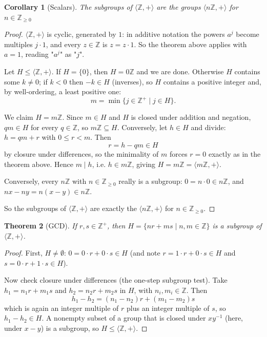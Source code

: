 \documentclass[11pt]{article}
\newcommand{\1}{\mathbf{1}}
\theoremstyle{notestyle}
\newtheorem{theorem}{Theorem}[section]
\newtheorem{corollary}[theorem]{Corollary}
\theoremstyle{definition}
\begin{document}
\begin{corollary}[Scalars]
\label{cor:label}
The subgroups of $\langle \mathbb{Z}, + \rangle$ are the groups $\langle n\mathbb{Z}, +\rangle$
for $n \in \mathbb{Z}_{\ge 0}$
\end{corollary}
\begin{proof}
$\langle \mathbb{Z}, + \rangle$ is cyclic, generated by $1$: in additive notation the
powers $a^{j}$ become multiples $j \cdot 1$, and every $z \in \mathbb{Z}$ is
$z = z \cdot 1$. So the theorem above applies with $a = 1$, reading "$a^{j}$" as
"$j$".
\par Let $H \le \langle \mathbb{Z}, + \rangle$. If $H = \{0\}$, then $H = 0\mathbb{Z}$
and we are done. Otherwise $H$ contains some $k \ne 0$; if $k < 0$ then $-k \in H$
(inverses), so $H$ contains a positive integer and, by well-ordering, a least
positive one:
$$m = \min\{j \in \mathbb{Z}^{+} \mid j \in H\}.$$
\par We claim $H = m\mathbb{Z}$. Since $m \in H$ and $H$ is closed under addition and
negation, $qm \in H$ for every $q \in \mathbb{Z}$, so $m\mathbb{Z} \subseteq H$.
Conversely, let $h \in H$ and divide: $h = qm + r$ with $0 \le r < m$. Then
$$r = h - qm \in H$$
by closure under differences, so the minimality of $m$ forces $r = 0$ exactly as in
the theorem above. Hence $m \mid h$, i.e. $h \in m\mathbb{Z}$, giving
$H = m\mathbb{Z} = \langle m\mathbb{Z}, + \rangle$.
\par Conversely, every $n\mathbb{Z}$ with $n \in \mathbb{Z}_{\ge 0}$ really is a
subgroup: $0 = n \cdot 0 \in n\mathbb{Z}$, and $nx - ny = n(x - y) \in n\mathbb{Z}$.
\par So the subgroups of $\langle \mathbb{Z}, + \rangle$ are exactly the
$\langle n\mathbb{Z}, + \rangle$ for $n \in \mathbb{Z}_{\ge 0}$.
\end{proof}
\begin{theorem}[GCD]
\label{thm:label}
If $r, s \in \mathbb{Z}^{+}$, then $H = \{nr + ms \mid n, m \in \mathbb{Z}\}$ is a
subgroup of $\langle \mathbb{Z}, +\rangle$.
\end{theorem}
\begin{proof}
First, $H \ne \emptyset$: $0 = 0 \cdot r + 0 \cdot s \in H$ (and note
$r = 1 \cdot r + 0 \cdot s \in H$ and $s = 0 \cdot r + 1 \cdot s \in H$).
\par Now check closure under differences (the one-step subgroup test). Take
$h_1 = n_1 r + m_1 s$ and $h_2 = n_2 r + m_2 s$ in $H$, with $n_i, m_i \in
\mathbb{Z}$. Then
$$h_1 - h_2 = (n_1 - n_2) r + (m_1 - m_2) s$$
which is again an integer multiple of $r$ plus an integer multiple of $s$, so
$h_1 - h_2 \in H$. A nonempty subset of a group that is closed under
$x y^{-1}$ (here, under $x - y$) is a subgroup, so $H \le \langle \mathbb{Z},
+\rangle$.
\end{proof}
\end{document}
